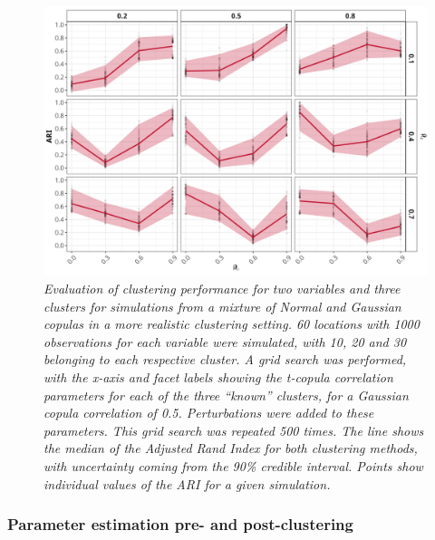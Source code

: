\documentclass{article}
\numberwithin{equation}{section}
\begin{document}
\begin{figure}[H]
    \centering
    \includegraphics[width = 0.9\linewidth]{plots/sim_01d_js_sens_3_var_dqu_0.9.png}
    \caption{\emph{Evaluation of clustering performance for two variables and three clusters for simulations from a mixture of Normal and Gaussian copulas in a more realistic clustering setting. 60 locations with 1000 observations for each variable were simulated, with 10, 20 and 30 belonging to each respective cluster. A grid search was performed, with the x-axis and facet labels showing the t-copula correlation parameters for each of the three ``known'' clusters, for a Gaussian copula correlation of 0.5. Perturbations were added to these parameters. This grid search was repeated 500 times. The line shows the median of the Adjusted Rand Index for both clustering methods, with uncertainty coming from the 90\% credible interval. Points show individual values of the ARI for a given simulation.}} 
    \label{fig:03_realistic}
\end{figure}

\subsubsection{Parameter estimation pre- and post-clustering} \label{subsubsec:boot}

\end{document}
